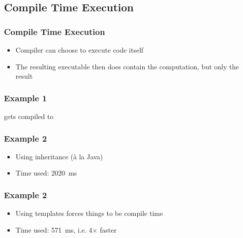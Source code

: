 \subsection{Compile Time Execution}

\frame{\tableofcontents[currentsubsection]}

\begin{frame}
  \frametitle{Compile Time Execution}
  \begin{itemize}
    \item Compiler can choose to execute code itself
    \item The resulting executable then does contain the computation, but only the result
  \end{itemize}
\end{frame}

\begin{frame}
  \frametitle{Example 1}
  \begin{center}
    gets compiled to
  \end{center}
\end{frame}

\begin{frame}
  \frametitle{Example 2}
  \vskip-5mm
  \begin{itemize}
    \item Using inheritance (\`a la Java)
    \item Time used: \SI{2020}{\milli\second}
  \end{itemize}
\end{frame}

\begin{frame}
  \frametitle{Example 2}
  \vskip-5mm
  \begin{itemize}
    \item Using templates forces things to be compile time
    \item Time used: \SI{571}{\milli\second}, i.e. 4$\times$ faster
  \end{itemize}
\end{frame}


